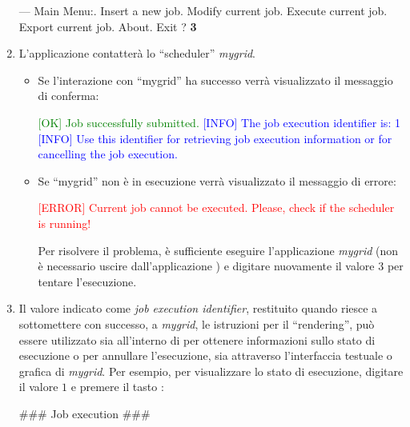 \begin{enumerate}
\begin{mgCodeBox}
--- Main Menu:. Insert a new job. Modify current job. Execute current job. Export current job. About. Exit\newline
? \textbf{3}
\end{mgCodeBox}
\item L'applicazione \mgTheApp{} contatter\`a lo ``scheduler'' \emph{mygrid}.
\begin{itemize}
\item Se l'interazione con ``mygrid'' ha successo verr\`a visualizzato il messaggio di conferma:
\begin{mgCodeBox} 
\small
\textcolor{green}{[OK] Job successfully submitted.}\newline
\textcolor{blue}{[INFO] The job execution identifier is: 1}\newline
\textcolor{blue}{[INFO] Use this identifier for retrieving job\newline
execution information or for cancelling the job\newline
execution.}
\end{mgCodeBox} 
\item Se ``mygrid'' non \`e in esecuzione verr\`a visualizzato il messaggio di errore:
\begin{mgCodeBox}
\small
\textcolor{red}{[ERROR] Current job cannot be executed. Please, check if the scheduler is running!}
\end{mgCodeBox}
Per risolvere il problema, \`e sufficiente eseguire l'applicazione \emph{mygrid} (non \`e necessario uscire dall'applicazione \mgTheApp{}) e digitare nuovamente il valore $3$ per tentare l'esecuzione.
\end{itemize}
\item Il valore indicato come \emph{job execution identifier}, restituito quando \mgTheApp{} riesce a sottomettere con successo, a \emph{mygrid}, le istruzioni per il ``rendering'', pu\`o essere utilizzato sia all'interno di \mgTheApp{} per ottenere informazioni sullo stato di esecuzione o per annullare l'esecuzione, sia attraverso l'interfaccia testuale o grafica di \emph{mygrid}. Per esempio, per visualizzare lo stato di esecuzione, digitare il valore $1$ e premere il tasto :
\begin{mgCodeBox}
\small
\#\#\# Job execution \#\#\#\newline

\end{mgCodeBox}
\end{enumerate}
